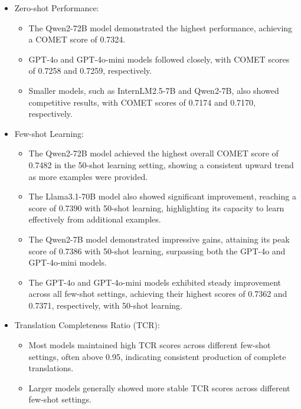 \documentclass[conference]{IEEEtran}
\begin{document}
\begin{itemize}
    \item Zero-shot Performance:
    \begin{itemize}
        \item The Qwen2-72B model demonstrated the highest performance, achieving a COMET score of 0.7324.
        \item GPT-4o and GPT-4o-mini models followed closely, with COMET scores of 0.7258 and 0.7259, respectively.
        \item Smaller models, such as InternLM2.5-7B and Qwen2-7B, also showed competitive results, with COMET scores of 0.7174 and 0.7170, respectively.
    \end{itemize}

    \item Few-shot Learning:
    \begin{itemize}
        \item The Qwen2-72B model achieved the highest overall COMET score of 0.7482 in the 50-shot learning setting, showing a consistent upward trend as more examples were provided.
        \item The Llama3.1-70B model also showed significant improvement, reaching a score of 0.7390 with 50-shot learning, highlighting its capacity to learn effectively from additional examples.
        \item The Qwen2-7B model demonstrated impressive gains, attaining its peak score of 0.7386 with 50-shot learning, surpassing both the GPT-4o and GPT-4o-mini models.
        \item The GPT-4o and GPT-4o-mini models exhibited steady improvement across all few-shot settings, achieving their highest scores of 0.7362 and 0.7371, respectively, with 50-shot learning.
    \end{itemize}

    \item Translation Completeness Ratio (TCR):
    \begin{itemize}
        \item Most models maintained high TCR scores across different few-shot settings, often above 0.95, indicating consistent production of complete translations.
        \item Larger models generally showed more stable TCR scores across different few-shot settings.
    \end{itemize}


\end{itemize}
\end{document}
